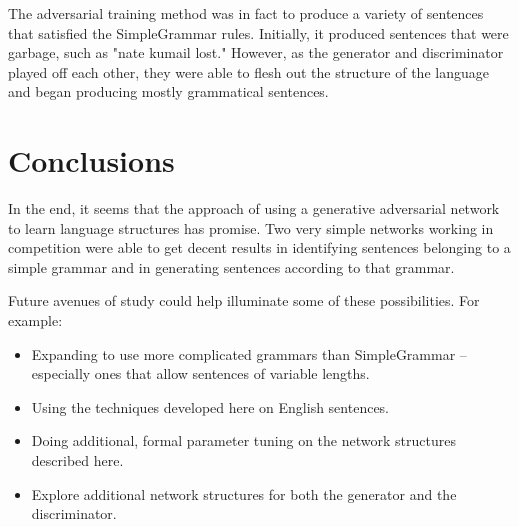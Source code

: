 \documentclass[11pt]{article}
\begin{document}
The adversarial training method was in fact to produce a variety of sentences that satisfied the SimpleGrammar rules. Initially, it produced sentences that were garbage, such as "nate kumail lost." However, as the generator and discriminator played off each other, they were able to flesh out the structure of the language and began producing mostly grammatical sentences.

\section{Conclusions}

In the end, it seems that the approach of using a generative adversarial network to learn language structures has promise. Two very simple networks working in competition were able to get decent results in identifying sentences belonging to a simple grammar and in generating sentences according to that grammar.

Future avenues of study could help illuminate some of these possibilities. For example:

\begin{itemize}
    \item Expanding to use more complicated grammars than SimpleGrammar -- especially ones that allow sentences of variable lengths.
    \item Using the techniques developed here on English sentences.
    \item Doing additional, formal parameter tuning on the network structures described here.
    \item Explore additional network structures for both the generator and the discriminator.
\end{itemize}

\newpage


\end{document}
